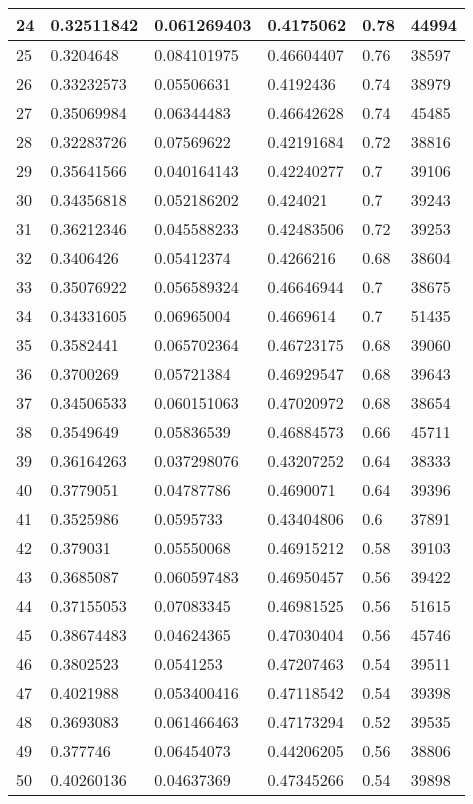\begin{longtable}{|l|l|l|l|l|l|}
24 & 0.32511842 & 0.061269403 & 0.4175062 & 0.78 & 44994 \\ \hline 
25 & 0.3204648 & 0.084101975 & 0.46604407 & 0.76 & 38597 \\ \hline 
26 & 0.33232573 & 0.05506631 & 0.4192436 & 0.74 & 38979 \\ \hline 
27 & 0.35069984 & 0.06344483 & 0.46642628 & 0.74 & 45485 \\ \hline 
28 & 0.32283726 & 0.07569622 & 0.42191684 & 0.72 & 38816 \\ \hline 
29 & 0.35641566 & 0.040164143 & 0.42240277 & 0.7 & 39106 \\ \hline 
30 & 0.34356818 & 0.052186202 & 0.424021 & 0.7 & 39243 \\ \hline 
31 & 0.36212346 & 0.045588233 & 0.42483506 & 0.72 & 39253 \\ \hline 
32 & 0.3406426 & 0.05412374 & 0.4266216 & 0.68 & 38604 \\ \hline 
33 & 0.35076922 & 0.056589324 & 0.46646944 & 0.7 & 38675 \\ \hline 
34 & 0.34331605 & 0.06965004 & 0.4669614 & 0.7 & 51435 \\ \hline 
35 & 0.3582441 & 0.065702364 & 0.46723175 & 0.68 & 39060 \\ \hline 
36 & 0.3700269 & 0.05721384 & 0.46929547 & 0.68 & 39643 \\ \hline 
37 & 0.34506533 & 0.060151063 & 0.47020972 & 0.68 & 38654 \\ \hline 
38 & 0.3549649 & 0.05836539 & 0.46884573 & 0.66 & 45711 \\ \hline 
39 & 0.36164263 & 0.037298076 & 0.43207252 & 0.64 & 38333 \\ \hline 
40 & 0.3779051 & 0.04787786 & 0.4690071 & 0.64 & 39396 \\ \hline 
41 & 0.3525986 & 0.0595733 & 0.43404806 & 0.6 & 37891 \\ \hline 
42 & 0.379031 & 0.05550068 & 0.46915212 & 0.58 & 39103 \\ \hline 
43 & 0.3685087 & 0.060597483 & 0.46950457 & 0.56 & 39422 \\ \hline 
44 & 0.37155053 & 0.07083345 & 0.46981525 & 0.56 & 51615 \\ \hline 
45 & 0.38674483 & 0.04624365 & 0.47030404 & 0.56 & 45746 \\ \hline 
46 & 0.3802523 & 0.0541253 & 0.47207463 & 0.54 & 39511 \\ \hline 
47 & 0.4021988 & 0.053400416 & 0.47118542 & 0.54 & 39398 \\ \hline 
48 & 0.3693083 & 0.061466463 & 0.47173294 & 0.52 & 39535 \\ \hline 
49 & 0.377746 & 0.06454073 & 0.44206205 & 0.56 & 38806 \\ \hline 
50 & 0.40260136 & 0.04637369 & 0.47345266 & 0.54 & 39898 \\ \hline 
\end{longtable}